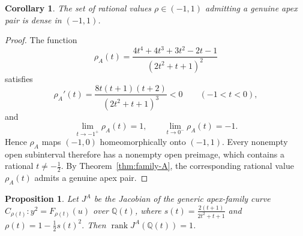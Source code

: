 \documentclass[11pt]{amsart}
\theoremstyle{plain}
\newtheorem{prop}[thm]{Proposition}
\newtheorem{coro}[thm]{Corollary}
\theoremstyle{remark}
\theoremstyle{plain}
\newcommand{\Q}{\mathbb{Q}}
\begin{document}
\begin{coro}\label{cor:apex-density}
The set of rational values $\rho\in(-1,1)$ admitting a genuine apex
pair is dense in $(-1,1)$.
\end{coro}

\begin{proof}
The function
\[
\rho_A(t)=
\frac{4t^4+4t^3+3t^2-2t-1}
     {(2t^2+t+1)^2}
\]
satisfies
\[
\rho_A'(t)
=
\frac{8t(t+1)(t+2)}
     {(2t^2+t+1)^3}<0
\qquad (-1<t<0),
\]
and
\[
\lim_{t\to-1^+}\rho_A(t)=1,
\qquad
\lim_{t\to0^-}\rho_A(t)=-1.
\]
Hence $\rho_A$ maps $(-1,0)$ homeomorphically onto $(-1,1)$.
Every nonempty open subinterval therefore has a nonempty open
preimage, which contains a rational
$t\ne-\frac12$. By Theorem~\ref{thm:family-A}, the corresponding
rational value $\rho_A(t)$ admits a genuine apex pair.
\end{proof}

\begin{prop}\label{prop:generic-rank}
Let $J^A$ be the Jacobian of the generic apex-family curve $C_{\rho(t)}\colon y^2=F_{\rho(t)}(u) $
over $\Q(t)$, where $
s(t)=\frac{2(t+1)}{2t^2+t+1}$ and $
\rho(t)=1-\frac12s(t)^2.$
Then
$\operatorname{rank}J^A(\Q(t))=1$.
\end{prop}
\end{document}
